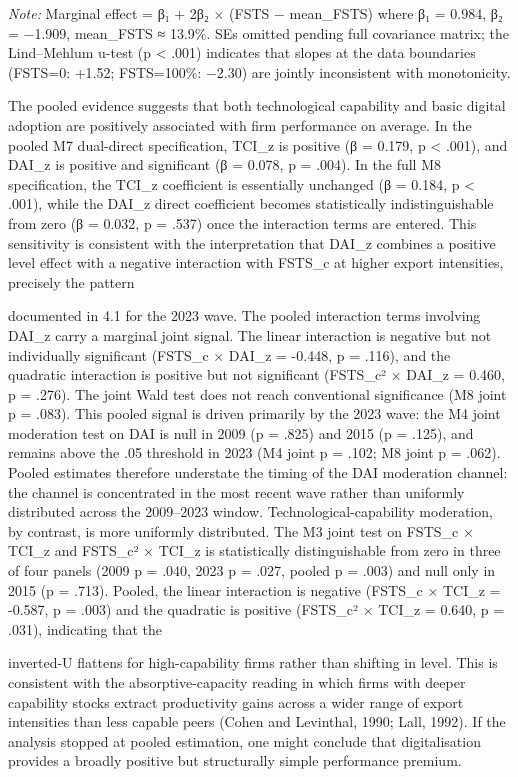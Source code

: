 \documentclass[12pt,a4paper]{article}
\begin{document}
\emph{Note:} Marginal effect = β₁ + 2β₂ × (FSTS − mean\_FSTS) where β₁ =
0.984, β₂ = −1.909, mean\_FSTS ≈ 13.9\%. SEs omitted pending full
covariance matrix; the Lind--Mehlum u-test (p \textless{} .001)
indicates that slopes at the data boundaries (FSTS=0: +1.52; FSTS=100\%:
−2.30) are jointly inconsistent with monotonicity.

The pooled evidence suggests that both technological capability and
basic digital adoption are positively associated with firm performance
on average. In the pooled M7 dual-direct specification, TCI\_z is
positive (β = 0.179, p \textless{} .001), and DAI\_z is positive and
significant (β = 0.078, p = .004). In the full M8 specification, the
TCI\_z coefficient is essentially unchanged (β = 0.184, p \textless{}
.001), while the DAI\_z direct coefficient becomes statistically
indistinguishable from zero (β = 0.032, p = .537) once the interaction
terms are entered. This sensitivity is consistent with the
interpretation that DAI\_z combines a positive level effect with a
negative interaction with FSTS\_c at higher export intensities,
precisely the pattern

documented in 4.1 for the 2023 wave. The pooled interaction terms
involving DAI\_z carry a marginal joint signal. The linear interaction
is negative but not individually significant (FSTS\_c × DAI\_z = -0.448,
p = .116), and the quadratic interaction is positive but not significant
(FSTS\_c² × DAI\_z = 0.460, p = .276). The joint Wald test does not
reach conventional significance (M8 joint p = .083). This pooled signal
is driven primarily by the 2023 wave: the M4 joint moderation test on
DAI is null in 2009 (p = .825) and 2015 (p = .125), and remains above
the .05 threshold in 2023 (M4 joint p = .102; M8 joint p = .062). Pooled
estimates therefore understate the timing of the DAI moderation channel:
the channel is concentrated in the most recent wave rather than
uniformly distributed across the 2009--2023 window.
Technological-capability moderation, by contrast, is more uniformly
distributed. The M3 joint test on FSTS\_c × TCI\_z and FSTS\_c² × TCI\_z
is statistically distinguishable from zero in three of four panels (2009
p = .040, 2023 p = .027, pooled p = .003) and null only in 2015 (p =
.713). Pooled, the linear interaction is negative (FSTS\_c × TCI\_z =
-0.587, p = .003) and the quadratic is positive (FSTS\_c² × TCI\_z =
0.640, p = .031), indicating that the

inverted-U flattens for high-capability firms rather than shifting in
level. This is consistent with the absorptive-capacity reading in which
firms with deeper capability stocks extract productivity gains across a
wider range of export intensities than less capable peers (Cohen and
Levinthal, 1990; Lall, 1992). If the analysis stopped at pooled
estimation, one might conclude that digitalisation provides a broadly
positive but structurally simple performance premium.
\end{document}
